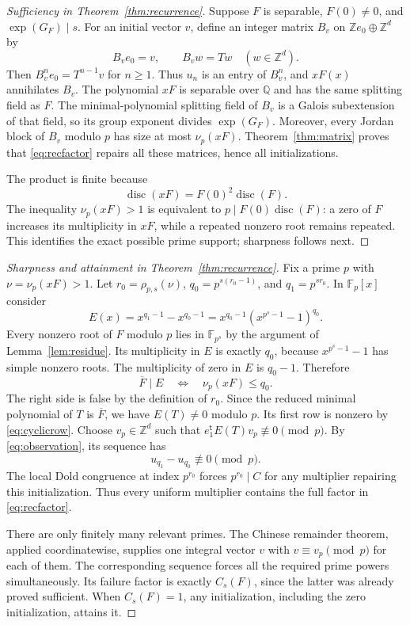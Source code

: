 \documentclass[11pt]{article}
\theoremstyle{remark}
\newcommand{\disc}{\operatorname{disc}}
\newcommand{\F}{\mathbb F}
\newcommand{\Z}{\mathbb Z}
\newcommand{\Q}{\mathbb Q}
\begin{document}
\begin{proof}[Sufficiency in Theorem~\ref{thm:recurrence}]
Suppose $F$ is separable, $F(0)\neq0$, and $\exp(G_F)\mid s$. For an initial vector $v$, define an integer matrix $B_v$ on $\Z e_0\oplus\Z^d$ by
\[
 B_v e_0=v,\qquad B_v w=Tw\quad(w\in\Z^d).
\]
Then $B_v^n e_0=T^{n-1}v$ for $n\geq1$. Thus $u_n$ is an entry of $B_v^n$, and $xF(x)$ annihilates $B_v$. The polynomial $xF$ is separable over $\Q$ and has the same splitting field as $F$. The minimal-polynomial splitting field of $B_v$ is a Galois subextension of that field, so its group exponent divides $\exp(G_F)$. Moreover, every Jordan block of $B_v$ modulo $p$ has size at most $\nu_p(xF)$. Theorem~\ref{thm:matrix} proves that \eqref{eq:recfactor} repairs all these matrices, hence all initializations.

The product is finite because
\[
 \disc(xF)=F(0)^2\disc(F).
\]
The inequality $\nu_p(xF)>1$ is equivalent to $p\mid F(0)\disc(F)$: a zero of $F$ increases its multiplicity in $xF$, while a repeated nonzero root remains repeated. This identifies the exact possible prime support; sharpness follows next.
\end{proof}

\begin{proof}[Sharpness and attainment in Theorem~\ref{thm:recurrence}]
Fix a prime $p$ with $\nu=\nu_p(xF)>1$. Let $r_0=\rho_{p,s}(\nu)$, $q_0=p^{s(r_0-1)}$, and $q_1=p^{sr_0}$. In $\F_p[x]$ consider
\begin{equation}\label{eq:criticalpolynomial}
 E(x)=x^{q_1-1}-x^{q_0-1}
     =x^{q_0-1}(x^{p^s-1}-1)^{q_0}.
\end{equation}
Every nonzero root of $F$ modulo $p$ lies in $\F_{p^s}$ by the argument of Lemma~\ref{lem:residue}. Its multiplicity in $E$ is exactly $q_0$, because $x^{p^s-1}-1$ has simple nonzero roots. The multiplicity of zero in $E$ is $q_0-1$. Therefore
\[
 \overline F\mid E\quad\Longleftrightarrow\quad\nu_p(xF)\leq q_0.
\]
The right side is false by the definition of $r_0$. Since the reduced minimal polynomial of $T$ is $\overline F$, we have $E(T)\neq0$ modulo $p$. Its first row is nonzero by \eqref{eq:cyclicrow}. Choose $v_p\in\Z^d$ such that $e_1^{\mathsf t}E(T)v_p\not\equiv0\pmod p$. By \eqref{eq:observation}, its sequence has
\[
 u_{q_1}-u_{q_0}\not\equiv0\pmod p.
\]
The local Dold congruence at index $p^{r_0}$ forces $p^{r_0}\mid C$ for any multiplier repairing this initialization. Thus every uniform multiplier contains the full factor in \eqref{eq:recfactor}.

There are only finitely many relevant primes. The Chinese remainder theorem, applied coordinatewise, supplies one integral vector $v$ with $v\equiv v_p\pmod p$ for each of them. The corresponding sequence forces all the required prime powers simultaneously. Its failure factor is exactly $C_s(F)$, since the latter was already proved sufficient. When $C_s(F)=1$, any initialization, including the zero initialization, attains it.
\end{proof}
\end{document}
